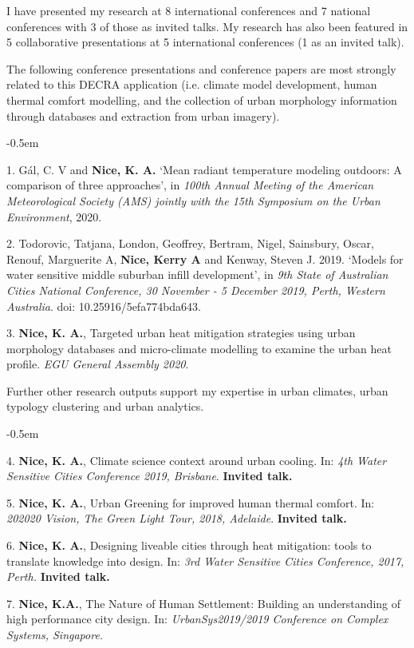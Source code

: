 I have presented my research at 8 international conferences and 7 national conferences with 3 of those as invited talks. My research has also been featured in 5 collaborative presentations at 5 international conferences (1 as an invited talk). 

The following conference presentations and conference papers are most strongly related to this DECRA application (i.e. climate model development, human thermal comfort modelling, and the collection of urban morphology information through databases and extraction from urban imagery).

\begin{list}{}{}
\itemsep-0.5em

\item [1.] G\'{a}l, C. V and \textbf{Nice, K. A.} ‘Mean radiant temperature modeling outdoors: A comparison of three approaches’, in \textit{100th Annual Meeting of the American Meteorological Society (AMS) jointly with the 15th Symposium on the Urban Environment}, 2020. 
\item [2.] Todorovic, Tatjana, London, Geoffrey, Bertram, Nigel, Sainsbury, Oscar, Renouf, Marguerite A, \textbf{Nice, Kerry A} and Kenway, Steven J. 2019. ‘Models for water sensitive middle suburban infill development’, in\textit{ 9th State of Australian Cities National Conference, 30 November - 5 December 2019, Perth, Western Australia}. doi: 10.25916/5efa774bda643. 
\item [3.] \textbf{Nice, K. A.}, Targeted urban heat mitigation strategies using urban morphology databases and micro-climate modelling to examine the urban heat profile. \textit{EGU General Assembly 2020}.

\end{list}

Further other research outputs support my expertise in urban climates, urban typology clustering and urban analytics.
\begin{list}{}{}
\itemsep-0.5em
\item [4.] \textbf{Nice, K. A.}, Climate science context around urban cooling. In: \textit{4th Water Sensitive Cities Conference 2019, Brisbane}. \textbf{Invited talk.}
\item [5.] \textbf{Nice, K. A.}, Urban Greening for improved human thermal comfort. In: \textit{202020 Vision, The Green Light Tour, 2018, Adelaide}. \textbf{Invited talk.}
\item [6.] \textbf{Nice, K. A.}, Designing liveable cities through heat mitigation: tools to translate knowledge into design. In: \textit{3rd Water Sensitive Cities Conference, 2017, Perth.} \textbf{Invited talk.}
\item [7.] \textbf{Nice, K.A.}, The Nature of Human Settlement: Building an understanding of high performance city design. In: \textit{UrbanSys2019/2019 Conference on Complex Systems, Singapore.}
\end{list}

